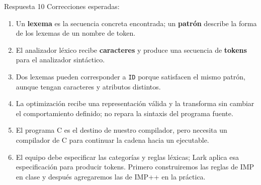 \documentclass[11pt,spanish]{article}
\begin{document}
\ifrespuestas
\begin{respuesta}{Respuesta 10}
Correcciones esperadas:
\begin{enumerate}[leftmargin=*]
    \item Un \textbf{lexema} es la secuencia concreta encontrada; un \textbf{patrón} describe la forma de los lexemas de un nombre de token.
    \item El analizador léxico recibe \textbf{caracteres} y produce una secuencia de \textbf{tokens} para el analizador sintáctico.
    \item Dos lexemas pueden corresponder a \texttt{ID} porque satisfacen el mismo patrón, aunque tengan caracteres y atributos distintos.
    \item La optimización recibe una representación válida y la transforma sin cambiar el comportamiento definido; no repara la sintaxis del programa fuente.
    \item El programa \textsc{C} es el destino de nuestro compilador, pero necesita un compilador de \textsc{C} para continuar la cadena hacia un ejecutable.
    \item El equipo debe especificar las categorías y reglas léxicas; Lark aplica esa especificación para producir tokens. Primero construiremos las reglas de \textsc{IMP} en clase y después agregaremos las de \textsc{IMP++} en la práctica.
\end{enumerate}
\end{respuesta}
\fi
\end{document}
